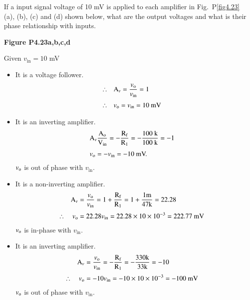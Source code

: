 \begin{problem}\label{prob4.23}
If a input signal voltage of 10 mV is applied to each amplifier in Fig.~P\ref{fig4.23}(a), (b), (c) and (d) shown below, what are the output voltages and what is their phase relationship with inputs.
\begin{center}
{\bf Figure P4.23a,b,c,d}
\end{center}
\end{problem}

\begin{solution}
Given $v_{\text{in}}=10$ mV
\begin{itemize}
\item[(a)] It is a voltage follower.
\begin{align*}
\therefore\quad & \textrm{A}_{v}=\frac{v_{\textrm{o}}}{v_{\text{in}}}=1\\[3pt]
\therefore\quad & v_{\textrm{o}}=v_{\text{in}}=10\text{~mV}
\end{align*}

\item[(b)] It is an inverting amplifier.
\begin{align*}
& \textrm{A}_{v} \frac{\textrm{A}_{\textrm{o}}}{\textrm{V}_{\text{in}}}=-\frac{\textrm{R}_{\textrm{f}}}{\textrm{R}_{1}}=-\frac{100\text{~k}}{100\text{~k}}=-1\\[3pt]
& v_{\textrm{o}}=-v_{\text{in}}=-10\text{~mV.}
\end{align*}
$v_{\textrm{o}}$ is out of phase with $v_{\text{in}}$.

\item[(c)] It is a non-inverting amplifier.
\begin{align*}
\textrm{A}_{v} &= \frac{v_{\textrm{o}}}{v_{\text{in}}}=1+\frac{\textrm{R}_{\textrm{f}}}{\textrm{R}_{1}}=1+\frac{1\textrm{m}}{47\textrm{k}}=22.28\\[3pt]
\therefore\quad v_{\textrm{o}} &= 22.28 v_{\text{in}}=22.28\times 10\times 10^{-3}=222.77\text{~mV}
\end{align*}
$v_{\textrm{o}}$ is in-phase with $v_{\text{in}}$.

\item[(d)] It is an inverting amplifier.
\begin{align*}
\textrm{A}_{v} &= \frac{v_{\textrm{o}}}{v_{\text{in}}}=-\frac{\textrm{R}_{\textrm{f}}}{\textrm{R}_{1}}=-\frac{330\textrm{k}}{33\textrm{k}}=-10\\[3pt]
\therefore\quad v_{\textrm{o}} &=-10v_{\text{in}}=-10\times 10\times 10^{-3}=-100\text{~mV}
\end{align*}
$v_{\textrm{o}}$ is out of phase with $v_{\text{in}}$.
\end{itemize}
\end{solution}

